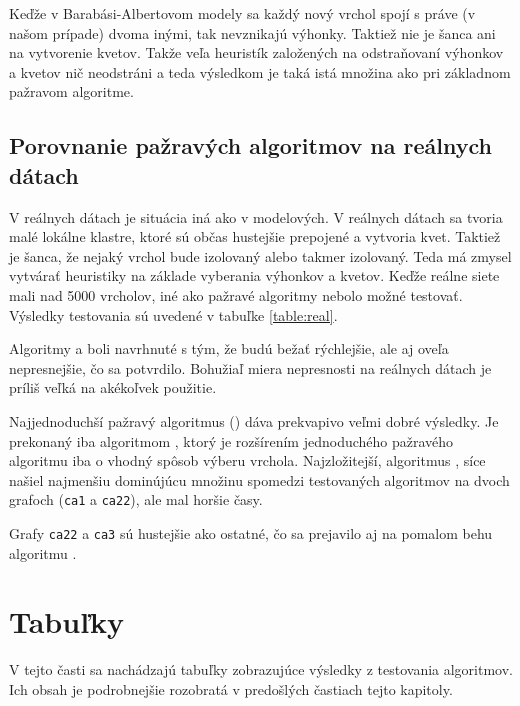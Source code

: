 Keďže v Barabási-Albertovom modely sa každý nový vrchol spojí s práve (v našom 
prípade) dvoma inými, tak nevznikajú výhonky. Taktiež nie je šanca ani na 
vytvorenie kvetov. Takže veľa heuristík založených na odstraňovaní výhonkov a 
kvetov nič neodstráni a teda výsledkom je taká istá množina ako pri základnom 
pažravom algoritme.

\subsection{Porovnanie pažravých algoritmov na reálnych dátach}

V reálnych dátach je situácia iná ako v modelových. V reálnych dátach sa tvoria 
malé lokálne klastre, ktoré sú občas hustejšie prepojené a vytvoria kvet. 
Taktiež je šanca, že nejaký vrchol bude izolovaný alebo takmer izolovaný. Teda 
má zmysel vytvárať heuristiky na základe vyberania výhonkov a kvetov. Keďže 
reálne siete mali nad 5000 vrcholov, iné ako pažravé algoritmy nebolo možné 
testovať. Výsledky testovania sú uvedené v tabuľke \ref{table:real}. 

Algoritmy  a  boli navrhnuté s tým, že budú bežať 
rýchlejšie, ale aj oveľa nepresnejšie, čo sa potvrdilo. Bohužiaľ miera 
nepresnosti na reálnych dátach je príliš veľká na akékoľvek použitie.

Najjednoduchší pažravý algoritmus () dáva 
prekvapivo veľmi dobré výsledky. Je prekonaný iba algoritmom , 
ktorý je rozšírením jednoduchého pažravého algoritmu iba o vhodný spôsob 
výberu vrchola. Najzložitejší, algoritmus , síce našiel najmenšiu 
dominújúcu množinu spomedzi testovaných algoritmov na dvoch grafoch 
(\texttt{ca1} a \texttt{ca22}), ale mal horšie časy. 

Grafy \texttt{ca22} a \texttt{ca3} sú hustejšie ako ostatné, čo sa prejavilo aj 
na pomalom behu algoritmu .

\section{Tabuľky}

V tejto časti sa nachádzajú tabuľky zobrazujúce výsledky z testovania 
algoritmov. Ich obsah je podrobnejšie rozobratá v predošlých častiach tejto 
kapitoly.

